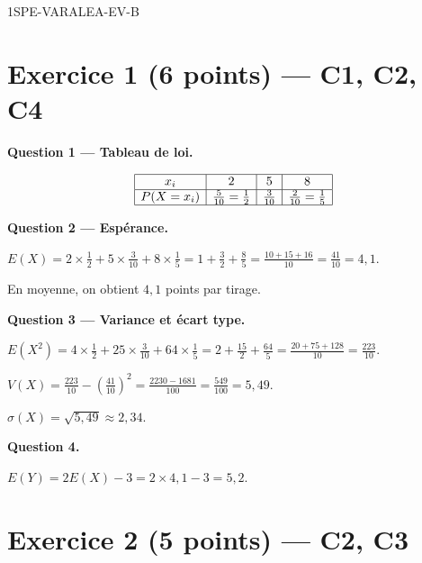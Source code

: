 \begin{corrige}{1SPE-VARALEA-EV-B}

\section*{Exercice 1 \hfill (6 points) — C1, C2, C4}


\textbf{Question 1 — Tableau de loi.}

\[
\begin{array}{|c|c|c|c|}
\hline
x_i & 2 & 5 & 8 \\
\hline
P(X=x_i) & \frac{5}{10} = \frac{1}{2} & \frac{3}{10} & \frac{2}{10} = \frac{1}{5} \\
\hline
\end{array}
\]

\medskip
\textbf{Question 2 — Espérance.}

$E(X) = 2 \times \frac{1}{2} + 5 \times \frac{3}{10} + 8 \times \frac{1}{5} = 1 + \frac{3}{2} + \frac{8}{5} = \frac{10+15+16}{10} = \frac{41}{10} = 4{,}1$.

En moyenne, on obtient $4{,}1$ points par tirage.

\medskip
\textbf{Question 3 — Variance et écart type.}

$E(X^2) = 4 \times \frac{1}{2} + 25 \times \frac{3}{10} + 64 \times \frac{1}{5} = 2 + \frac{15}{2} + \frac{64}{5} = \frac{20+75+128}{10} = \frac{223}{10}$.

$V(X) = \frac{223}{10} - \left(\frac{41}{10}\right)^2 = \frac{2230-1681}{100} = \frac{549}{100} = 5{,}49$.

$\sigma(X) = \sqrt{5{,}49} \approx 2{,}34$.

\medskip
\textbf{Question 4.}

$E(Y) = 2E(X) - 3 = 2 \times 4{,}1 - 3 = 5{,}2$.

\section*{Exercice 2 \hfill (5 points) — C2, C3}



\end{corrige}
